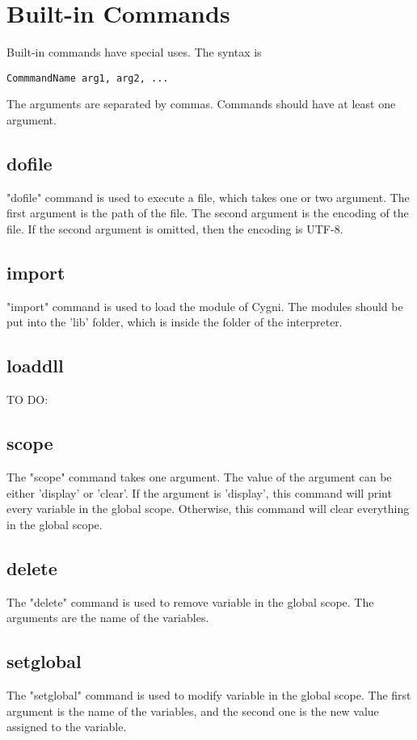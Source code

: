 \chapter{Built-in Commands}
Built-in commands have special uses. The syntax is

\begin{lstlisting}
CommmandName arg1, arg2, ...
\end{lstlisting}
The arguments are separated by commas. Commands should have at least one argument.
\section{dofile}
"dofile" command is used to execute a file, which takes one or two argument. The first argument is the path of the file. The second argument is the encoding of the file. If the second argument is omitted, then the encoding is UTF-8.
\section{import}
"import" command is used to load the module of Cygni. The modules should be put into the 'lib' folder, which is inside the folder of the interpreter.
\section{loaddll}
TO DO:
\section{scope}
The "scope" command takes one argument. The value of the argument can be either 'display' or 'clear'. If the argument is 'display', this command will print every variable in the global scope. Otherwise, this command will clear everything in the global scope.
\section{delete}
The "delete" command is used to remove variable in the global scope. The arguments are the name of the variables.
\section{setglobal}
The "setglobal" command is used to modify variable in the global scope. The first argument is the name of the variables, and the second one is the new value assigned to the variable.
